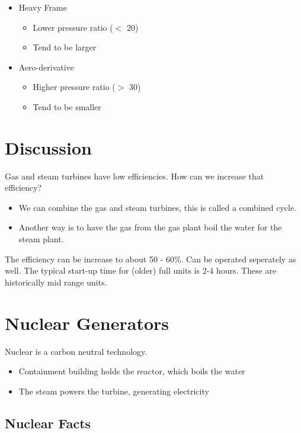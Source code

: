 \documentclass[12pt, a4paper]{report}
\begin{document}
  \begin{itemize}
    \item Heavy Frame
      \begin{itemize}
        \item Lower pressure ratio ($ < $ 20)
        \item Tend to be larger
      \end{itemize}
    \item Aero-derivative
      \begin{itemize}
        \item Higher pressure ratio ($ > $ 30)
        \item Tend to be smaller
      \end{itemize}
  \end{itemize}

  \section{Discussion}

  Gas and steam turbines have low efficiencies. How can we increase that efficiency?

  \begin{itemize}
    \item We can combine the gas and steam turbines, this is called a combined cycle.
    \item Another way is to have the gas from the gas plant boil the water for the steam plant.
  \end{itemize}

  The efficiency can be increase to about 50 - 60\%. Can be operated seperately as well. The typical start-up time for (older) full units is 2-4 hours. These are historically mid range units.

  \section{Nuclear Generators}

  Nuclear is a carbon neutral technology.

  \begin{itemize}
    \item Containment building holds the reactor, which boils the water
    \item The steam powers the turbine, generating electricity
  \end{itemize}

  \subsection{Nuclear Facts}
\end{document}
